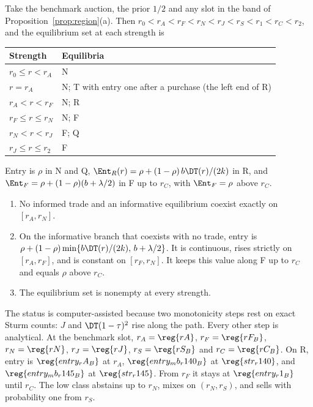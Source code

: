 \begin{proposition}\label{prop:coexistence}
Take the benchmark auction, the prior \(1/2\) and any slot in the band of Proposition~\ref{prop:region}(a). Then
\(r_0<r_A<r_F<r_N<r_J<r_S<r_1<r_C<r_2\), and the equilibrium set at each strength is
\begin{center}
\begin{tabular}{@{}ll@{}}
\toprule
Strength & Equilibria\\
\midrule
\(r_0\le r<r_A\) & N\\
\(r=r_A\) & N; T with entry one after a purchase (the left end of R)\\
\(r_A<r<r_F\) & N; R\\
\(r_F\le r\le r_N\) & N; F\\
\(r_N<r<r_J\) & F; Q\\
\(r_J\le r\le r_2\) & F\\
\bottomrule
\end{tabular}
\end{center}
Entry is \(\rho\) in N and Q, \(\Ent_R(r)=\rho+(1-\rho)\,b\DT(r)/(2k)\) in R, and
\(\Ent_F=\rho+(1-\rho)(b+\lambda/2)\) in F up to \(r_C\), with \(\Ent_F=\rho\) above \(r_C\).
\begin{enumerate}[label=(\alph*),leftmargin=2em]
\item No informed trade and an informative equilibrium coexist exactly on \([r_A,r_N]\).
\item On the informative branch that coexists with no trade, entry is
\(\rho+(1-\rho)\min\{b\DT(r)/(2k),\,b+\lambda/2\}\). It is continuous, rises strictly on \([r_A,r_F]\), and is
constant on \([r_F,r_N]\). It keeps this value along F up to \(r_C\) and equals \(\rho\) above \(r_C\).
\item The equilibrium set is nonempty at every strength.
\end{enumerate}
\end{proposition}

The status is computer-assisted because two monotonicity steps rest on exact Sturm counts: \(J\) and
\(\DT(1-\tau)^2\) rise along the path. Every other step is analytical. At the benchmark slot,
\(r_A=\reg{rA}\), \(r_F=\reg{rF_B}\), \(r_N=\reg{rN}\), \(r_J=\reg{rJ}\), \(r_S=\reg{rS_B}\) and
\(r_C=\reg{rC_B}\). On R, entry is \(\reg{entry_rA_B}\) at \(r_A\), \(\reg{entry_mb_r140_B}\) at
\(\reg{str_r140}\), and \(\reg{entry_mb_r145_B}\) at \(\reg{str_r145}\). From \(r_F\) it stays at
\(\reg{entry_r1_B}\) until \(r_C\). The low class abstains up to \(r_N\), mixes on \((r_N,r_S)\), and sells with
probability one from \(r_S\).

